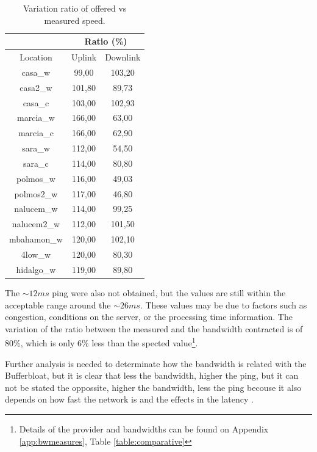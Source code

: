 \begin{table}[ht]
\begin{center}
\begin{tabular}{|c||c|c||}
 \hline
& \multicolumn{2}{|c|}{Ratio (\%)} \\ \hline
Location	& Uplink		& Downlink \\ \hline \hline
casa\_w		& 99,00			& 103,20 \\ \hline
casa2\_w	& 101,80		&  89,73  \\ \hline
casa\_c		& 103,00		& 102,93  \\ \hline
marcia\_w	& 166,00		&  63,00  \\ \hline
marcia\_c	& 166,00		&  62,90  \\ \hline
sara\_w		& 112,00		&  54,50  \\ \hline
sara\_c		& 114,00		&  80,80 \\ \hline
polmos\_w	& 116,00		&  49,03  \\ \hline
polmos2\_w 	& 117,00		&  46,80  \\ \hline
nalucem\_w	& 114,00		&  99,25  \\ \hline
nalucem2\_w & 112,00		& 101,50  \\ \hline
mbahamon\_w & 120,00		& 102,10  \\ \hline
4low\_w	 	& 120,00		&  80,30  \\ \hline
hidalgo\_w 	& 119,00		&  89,80  \\ \hline
\end{tabular}
\caption[Speed Test: Variation ratio of offered vs measured speed ]{Variation ratio of offered vs measured speed.}
\label{table:ratiospeed}
\end{center}
\end{table}

The $\sim12ms$ ping were also not obtained, but the values ​​are still within
the acceptable range around the $\sim26ms$. These values ​​may be due to
factors such as congestion, conditions on the server, or the processing time
information. The variation of the ratio between the measured and the bandwidth
contracted is of 80\%, which is only 6\% less than the spected
value\footnote{Details of the provider and bandwidths can be found on Appendix
\ref{app:bwmeasures}, Table \ref{table:comparative}}.

Further analysis is needed to determinate how the bandwidth is related with
the Bufferbloat, but it is clear that less the bandwidth, higher the ping, but
it can not be stated the oppossite, higher the bandwidth, less the ping
becouse it also depends on how fast the network is and the effects in the
latency \cite{main:ref:3}.
